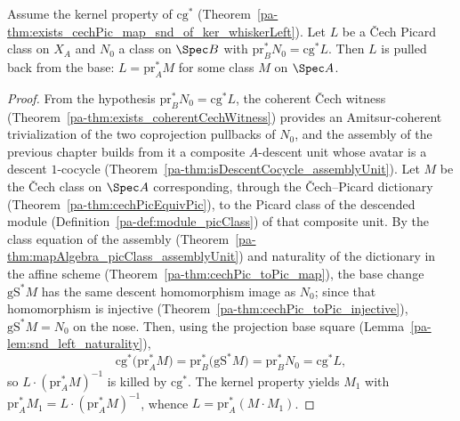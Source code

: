 \begin{theorem}
  \label{pa-thm:exists_cechPic_map_snd_eq_of_ker}
  \leanok

  Assume the kernel property of \(\mathrm{cg}^{*}\) (Theorem~\ref{pa-thm:exists_cechPic_map_snd_of_ker_whiskerLeft}).
  Let \(L\) be a \v Cech Picard class on \(X_A\) and \(N_0\) a class on \(\Spec B\) with
  \(\mathrm{pr}_B^{*} N_0 = \mathrm{cg}^{*} L\).  Then \(L\) is pulled back from the base:
  \(L = \mathrm{pr}_A^{*} M\) for some class \(M\) on \(\Spec A\).
\end{theorem}
\begin{proof}
  \leanok
  From the hypothesis \(\mathrm{pr}_B^{*} N_0 = \mathrm{cg}^{*} L\), the coherent \v Cech witness
  (Theorem~\ref{pa-thm:exists_coherentCechWitness}) provides an Amitsur-coherent trivialization of
  the two coprojection pullbacks of \(N_0\), and the assembly of the previous chapter builds from
  it a composite \(A\)-descent unit whose avatar is a descent \(1\)-cocycle
  (Theorem~\ref{pa-thm:isDescentCocycle_assemblyUnit}).  Let \(M\) be the \v Cech class on \(\Spec
  A\) corresponding, through the \v Cech–Picard dictionary
  (Theorem~\ref{pa-thm:cechPicEquivPic}), to the Picard class of the descended module
  (Definition~\ref{pa-def:module_picClass}) of that composite unit.  By the class equation of the
  assembly (Theorem~\ref{pa-thm:mapAlgebra_picClass_assemblyUnit}) and naturality of the dictionary
  in the affine scheme (Theorem~\ref{pa-thm:cechPic_toPic_map}), the base change \(\mathrm{gS}^{*}
  M\) has the same descent homomorphism image as \(N_0\); since that homomorphism is injective
  (Theorem~\ref{pa-thm:cechPic_toPic_injective}), \(\mathrm{gS}^{*} M = N_0\) on the nose.  Then,
  using the projection base square (Lemma~\ref{pa-lem:snd_left_naturality}),
  \[
    \mathrm{cg}^{*}\bigl(\mathrm{pr}_A^{*} M\bigr) = \mathrm{pr}_B^{*}\bigl(\mathrm{gS}^{*} M\bigr)
      = \mathrm{pr}_B^{*} N_0 = \mathrm{cg}^{*} L ,
  \]
  so \(L \cdot (\mathrm{pr}_A^{*} M)^{-1}\) is killed by \(\mathrm{cg}^{*}\).  The kernel
  property yields \(M_1\) with \(\mathrm{pr}_A^{*} M_1 = L \cdot (\mathrm{pr}_A^{*} M)^{-1}\),
  whence \(L = \mathrm{pr}_A^{*}(M \cdot M_1)\).
\end{proof}

